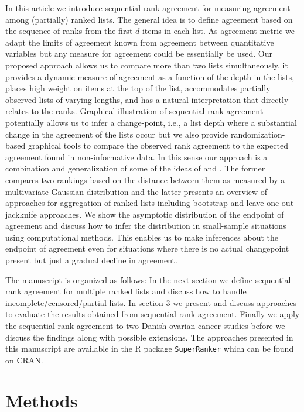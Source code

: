 \documentclass[12pt,a4paper]{article}
\theoremstyle{plain}
\begin{document}
In this article we introduce sequential rank agreement for measuring
agreement among (partially) ranked lists.  The general idea is to
define agreement based on the sequence of ranks from the first $d$
items in each list. As agreement metric we adapt the limits of
agreement known from agreement between quantitative variables
\citep{alt:bland:1983,Carstensen2010} but any measure for agreement
could be essentially be used. Our proposed approach allows us to
compare more than two lists simultaneously, it provides a dynamic
measure of agreement as a function of the depth in the lists, places
high weight on items at the top of the list, accommodates partially
observed lists of varying lengths, and has a natural interpretation
that directly relates to the ranks.  Graphical illustration of
sequential rank agreement potentially allows us to infer a
change-point, i.e., a list depth where a substantial change in the agreement of
the lists occur but we also provide randomization-based graphical
tools to compare the observed rank agreement to the expected agreement
found in non-informative data.  In this sense our approach is a
combination and generalization of some of the ideas of
\citet{Carterette2009} and \citet{Boulesteix2009}. The former compares
two rankings based on the distance between them as measured by a
multivariate Gaussian distribution and the latter presents an overview
of approaches for aggregation of ranked lists including bootstrap and
leave-one-out jackknife approaches. We show the asymptotic
distribution of the endpoint of agreement and discuss how to infer the
distribution in small-sample situations using computational
methods. This enables us to make inferences about the endpoint of
agreement even for situations where there is no actual changepoint
present but just a gradual decline in agreement.

The manuscript is organized as follows: In the next section we define
sequential rank agreement for multiple ranked lists and discuss how to
handle incomplete/censored/partial lists. In section 3 we present and
discuss approaches to evaluate the results obtained from sequential
rank agreement. Finally we apply the sequential rank agreement to two
Danish ovarian cancer studies before we discuss the findings along
with possible extensions. The approaches presented in this manuscript
are available in the R package \texttt{SuperRanker} which can be found
on CRAN.


\section{Methods}
\end{document}
